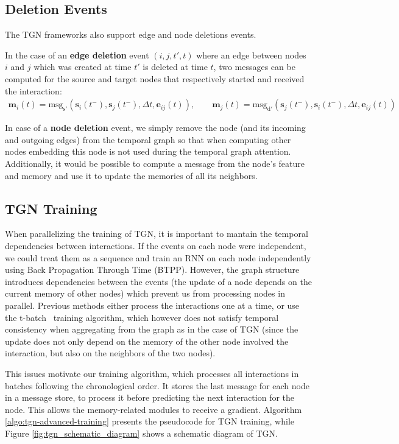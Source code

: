 \documentclass{article}
\begin{document}
\subsection{Deletion Events} \label{sec:deletion_events}
The TGN frameworks also support edge and node deletions events.

In the case of an {\bf edge deletion} event $(i, j, t', t)$ where an edge between nodes $i$ and $j$ which was created at time $t'$ is deleted at time $t$, two messages can be computed for the source and target nodes that respectively started and received the interaction:
\begin{eqnarray}
    \mathbf{m}_i(t) = \mathrm{msg_{s'}}\left(\mathbf{s}_i(t^-), \mathbf{s}_j(t^-), \Delta t, \mathbf{e}_{ij}(t)\right), \quad\quad
    \mathbf{m}_j(t) = \mathrm{msg_{d'}}\left(\mathbf{s}_j(t^-), \mathbf{s}_i(t^-), \Delta t, \mathbf{e}_{ij}(t)\right)
\end{eqnarray}

%
In case of a {\bf node deletion} event, we simply remove the node (and its incoming and outgoing edges) from the temporal graph so that when computing other nodes embedding this node is not used during the temporal graph attention. Additionally, it would be possible to compute a message from the node's feature and memory and use it to update the memories of all its neighbors.

\subsection{TGN Training} \label{sec:pseudocode}
When parallelizing the training of TGN, it is important to mantain the temporal dependencies between interactions. If the events on each node were independent, we could treat them as a sequence and train an RNN on each node independently using Back Propagation Through Time (BTPP). However, the graph structure introduces dependencies between the events (the update of a node depends on the current memory of other nodes) which prevent us from processing nodes in parallel. Previous methods either process the interactions one at a time, or use the t-batch~\citep{10.1145/3292500.3330895} training algorithm, which however does not satisfy temporal consistency when aggregating from the graph as in the case of TGN (since the update does not only depend on the memory of the other node involved the interaction, but also on the neighbors of the two nodes).

This issues motivate our training algorithm, which processes all interactions in batches following the chronological order. It stores the last message for each node in a message store, to process it before predicting the next interaction for the node. This allows the memory-related modules to receive a gradient. Algorithm \ref{algo:tgn-advanced-training} presents the pseudocode for TGN training, while Figure \ref{fig:tgn_schematic_diagram} shows a schematic diagram of TGN.
\end{document}
